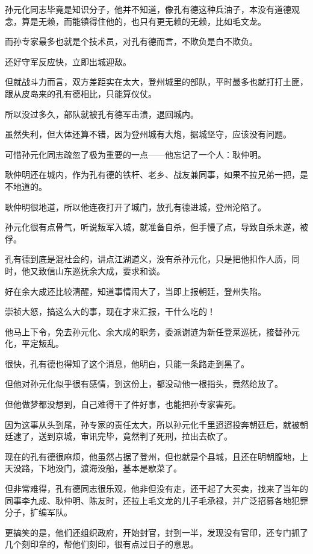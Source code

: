 \begin{multicols}{\theparacolNo}
孙元化同志毕竟是知识分子，他并不知道，像孔有德这种兵油子，本没有道德观念，算是无赖，而能镇得住他的，也只有更无赖的无赖，比如毛文龙。

而孙专家最多也就是个技术员，对孔有德而言，不欺负是白不欺负。

还好守军反应快，立即出城迎敌。

但就战斗力而言，双方差距实在太大，登州城里的部队，平时最多也就打打土匪，跟从皮岛来的孔有德相比，只能算仪仗。

所以没过多久，部队就被孔有德军击溃，退回城内。

虽然失利，但大体还算不错，因为登州城有大炮，据城坚守，应该没有问题。

可惜孙元化同志疏忽了极为重要的一点——他忘记了一个人：耿仲明。

耿仲明还在城内，作为孔有德的铁杆、老乡、战友兼同事，如果不拉兄弟一把，是不地道的。

耿仲明很地道，所以他连夜打开了城门，放孔有德进城，登州沦陷了。

孙元化很有点骨气，听说叛军入城，就准备自杀，但手慢了点，导致自杀未遂，被俘。

孔有德到底是混社会的，讲点江湖道义，没有杀孙元化，只是把他扣作人质，同时，他又致信山东巡抚余大成，要求和谈。

好在余大成还比较清醒，知道事情闹大了，当即上报朝廷，登州失陷。

崇祯大怒，搞这么大的事，现在才来汇报，干什么吃的！

他马上下令，免去孙元化、余大成的职务，委派谢涟为新任登莱巡抚，接替孙元化，平定叛乱。

很快，孔有德也得知了这个消息，他明白，只能一条路走到黑了。

但他对孙元化似乎很有感情，到这份上，都没动他一根指头，竟然给放了。

但他做梦都没想到，自己难得干了件好事，也能把孙专家害死。

因为这事从头到尾，孙专家的责任太大，所以孙元化千里迢迢投奔朝廷后，就被朝廷逮了，送到京城，审讯完毕，竟然判了死刑，拉出去砍了。

现在的孔有德很麻烦，他虽然占据了登州，但也就是个县城，且还在明朝腹地，上天没路，下地没门，渡海没船，基本是歇菜了。

但非常难得，孔有德同志很乐观，他非但没有走，还干起了大买卖，找来了当年的同事李九成、耿仲明、陈友时，还拉上毛文龙的儿子毛承禄，并广泛招募各地犯罪分子，扩编军队。

更搞笑的是，他们还组织政府，开始封官，封到一半，发现没有官印，还专门抓了几个刻印章的，帮他们刻印，很有点过日子的意思。


\end{multicols}
